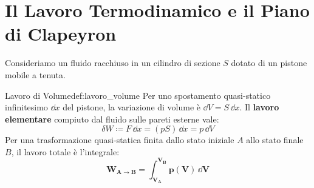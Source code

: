 \section{Il Lavoro Termodinamico e il Piano di Clapeyron}
\label{sec:lavoro_termodinamico}

Consideriamo un fluido racchiuso in un cilindro di sezione $S$ dotato di un pistone mobile a tenuta.

\begin{definizione}{Lavoro di Volume}{def:lavoro_volume}
Per uno spostamento quasi-statico infinitesimo $\dd x$ del pistone, la variazione di volume è $\dd V = S\,\dd x$. Il \textbf{lavoro elementare} compiuto dal fluido sulle pareti esterne vale:
\begin{equation}
    \delta W \coloneqq F\,\dd x = (p S)\,\dd x = p\,\dd V
    \label{eq:lavoro_termodinamico_elementare}
\end{equation}
Per una trasformazione quasi-statica finita dallo stato iniziale $A$ allo stato finale $B$, il lavoro totale è l'integrale:
\begin{equation}
    \mathbf{W_{A\to B} = \int_{V_A}^{V_B} p(V)\,\dd V}
    \label{eq:lavoro_clapeyron}
\end{equation}
\end{definizione}

\begin{center}
\end{center}

